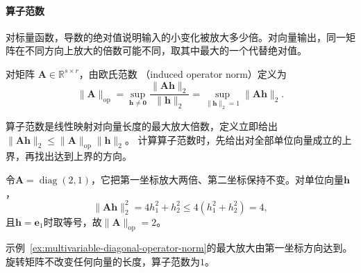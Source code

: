 \paragraph{算子范数}

对标量函数，导数的绝对值说明输入的小变化被放大多少倍。对向量输出，同一矩阵在不同方向上放大的倍数可能不同，取其中最大的一个代替绝对值。
\begin{definition}[欧氏诱导算子范数]
\label{def:analysis-induced-operator-norm}
对矩阵
$\bm{A}\in\mathbb{R}^{s\times r}$，由欧氏范数
（induced operator norm）定义为
\[
  \lVert\bm{A}\rVert_{\mathrm{op}}
  =
  \sup_{\bm{h}\neq\bm{0}}
  \frac{\lVert\bm{A}\bm{h}\rVert_2}{\lVert\bm{h}\rVert_2}
  =
  \sup_{\lVert\bm{h}\rVert_2=1}\lVert\bm{A}\bm{h}\rVert_2.
\]
\end{definition}
算子范数是线性映射对向量长度的最大放大倍数，定义立即给出
$\lVert\bm{A}\bm{h}\rVert_2
\leq\lVert\bm{A}\rVert_{\mathrm{op}}\lVert\bm{h}\rVert_2$。
计算算子范数时，先给出对全部单位向量成立的上界，再找出达到上界的方向。
\begin{example}[对角矩阵的算子范数]
\label{ex:multivariable-diagonal-operator-norm}
令$\bm A=\operatorname{diag}(2,1)$，它把第一坐标放大两倍、第二坐标保持不变。对单位向量$\bm h$，
\[
 \lVert\bm A\bm h\rVert_2^2=4h_1^2+h_2^2\leq4(h_1^2+h_2^2)=4,
\]
且$\bm h=\bm e_1$时取等号，故$\lVert\bm A\rVert_{\mathrm{op}}=2$。
\end{example}

示例~\ref{ex:multivariable-diagonal-operator-norm}的最大放大由第一坐标方向达到。旋转矩阵不改变任何向量的长度，算子范数为$1$。

